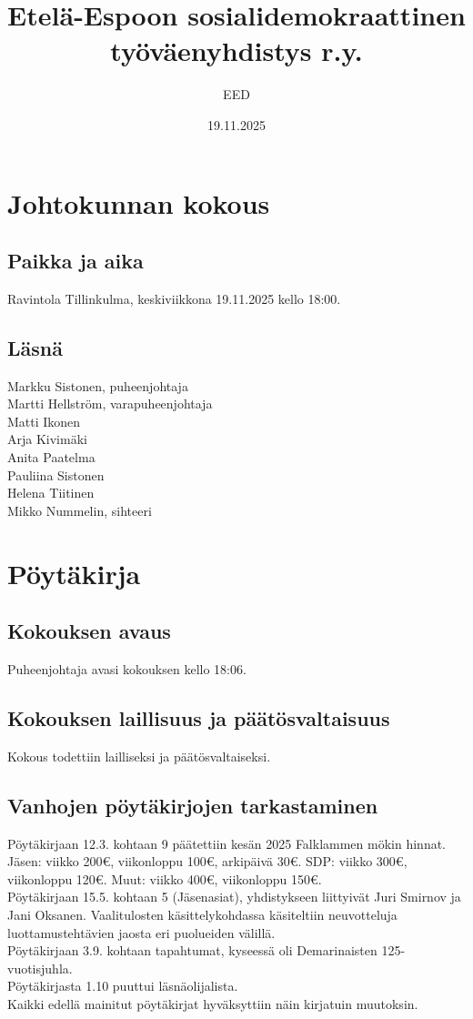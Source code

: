 \documentclass[a4paper,12pt]{article}
\title{Etelä-Espoon sosialidemokraattinen työväenyhdistys r.y.}
\author{EED}
\date{19.11.2025}
\begin{document}
\maketitle
\tableofcontents
\section*{Johtokunnan kokous}
\subsection*{Paikka ja aika}
Ravintola Tillinkulma, keskiviikkona 19.11.2025 kello 18:00.
\subsection*{Läsnä}
Markku Sistonen, puheenjohtaja \\
Martti Hellström, varapuheenjohtaja \\
Matti Ikonen \\
Arja Kivimäki \\
Anita Paatelma \\
Pauliina Sistonen \\
Helena Tiitinen \\
Mikko Nummelin, sihteeri
\section*{Pöytäkirja}
\subsection{Kokouksen avaus}
Puheenjohtaja avasi kokouksen kello 18:06.
\subsection{Kokouksen laillisuus ja päätösvaltaisuus}
Kokous todettiin lailliseksi ja päätösvaltaiseksi.
\subsection{Vanhojen pöytäkirjojen tarkastaminen}
Pöytäkirjaan 12.3. kohtaan 9 päätettiin kesän 2025 Falklammen mökin hinnat.
Jäsen: viikko 200\euro, viikonloppu 100\euro, arkipäivä 30\euro. SDP: viikko 300\euro, viikonloppu 120\euro. Muut: viikko 400\euro, viikonloppu 150\euro. \\
Pöytäkirjaan 15.5. kohtaan 5 (Jäsenasiat), yhdistykseen liittyivät Juri Smirnov ja Jani Oksanen. Vaalitulosten käsittelykohdassa käsiteltiin neuvotteluja luottamustehtävien jaosta eri puolueiden välillä. \\
Pöytäkirjaan 3.9. kohtaan tapahtumat, kyseessä oli Demarinaisten 125-vuotisjuhla. \\
Pöytäkirjasta 1.10 puuttui läsnäolijalista. \\
Kaikki edellä mainitut pöytäkirjat hyväksyttiin näin kirjatuin muutoksin.
\end{document}
